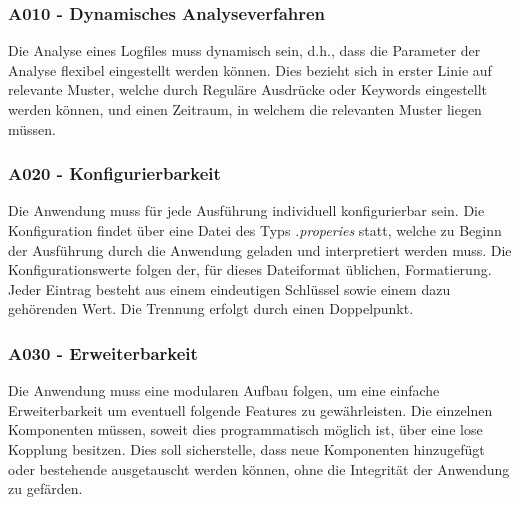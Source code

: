 \subsubsection{A010 - Dynamisches Analyseverfahren}\label{subsubsec:A010}
Die Analyse eines Logfiles muss dynamisch sein, d.h., dass die Parameter der Analyse flexibel eingestellt werden können. Dies bezieht sich in erster Linie auf relevante Muster, welche durch Reguläre Ausdrücke oder Keywords eingestellt werden können, und einen Zeitraum, in welchem die relevanten Muster liegen müssen.

\subsubsection{A020 - Konfigurierbarkeit}\label{subsubsec:A020}
Die Anwendung muss für jede  Ausführung individuell konfigurierbar sein. Die Konfiguration findet über eine Datei des Typs \textit{.properies} statt, welche zu Beginn der Ausführung durch die Anwendung geladen und interpretiert werden muss. Die Konfigurationswerte folgen der, für dieses Dateiformat üblichen, Formatierung. Jeder Eintrag besteht aus einem eindeutigen Schlüssel sowie einem dazu gehörenden Wert. Die Trennung erfolgt durch einen Doppelpunkt.

\subsubsection{A030 - Erweiterbarkeit}\label{subsubsec:A030}
Die Anwendung muss eine modularen Aufbau folgen, um eine einfache Erweiterbarkeit um eventuell folgende Features zu gewährleisten. Die einzelnen Komponenten müssen, soweit dies programmatisch möglich ist, über eine lose Kopplung besitzen. Dies soll sicherstelle, dass neue Komponenten hinzugefügt oder bestehende ausgetauscht werden können, ohne die Integrität der Anwendung zu gefärden.

